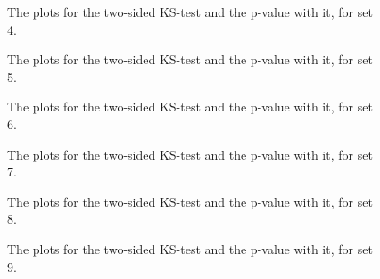  \begin{figure}
    \centering
    \qquad
    \caption{The plots for the two-sided KS-test and the p-value with it, for set 4.}
  
  \end{figure}
 \begin{figure}
    \centering
    \qquad
    \caption{The plots for the two-sided KS-test and the p-value with it, for set 5.}

  \end{figure}
 \begin{figure}
    \centering
    \qquad
    \caption{The plots for the two-sided KS-test and the p-value with it, for set 6.}
   
  \end{figure}
 \begin{figure}
    \centering
    \qquad
    \caption{The plots for the two-sided KS-test and the p-value with it, for set 7.}

  \end{figure}
 \begin{figure}
    \centering
    \qquad
    \caption{The plots for the two-sided KS-test and the p-value with it, for set 8.}

  \end{figure}
 \begin{figure}
    \centering
    \qquad
    \caption{The plots for the two-sided KS-test and the p-value with it, for set 9.}

  \end{figure}
  

